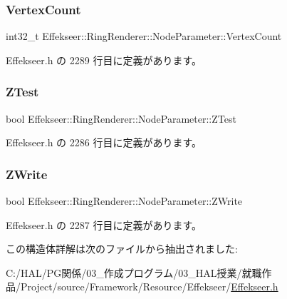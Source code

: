 \subsubsection{\texorpdfstring{Vertex\+Count}{VertexCount}}
{\footnotesize\ttfamily int32\+\_\+t Effekseer\+::\+Ring\+Renderer\+::\+Node\+Parameter\+::\+Vertex\+Count}



 Effekseer.\+h の 2289 行目に定義があります。

\mbox{\label{struct_effekseer_1_1_ring_renderer_1_1_node_parameter_a961db93480860064f1f432a6166e583e}} 
\subsubsection{\texorpdfstring{Z\+Test}{ZTest}}
{\footnotesize\ttfamily bool Effekseer\+::\+Ring\+Renderer\+::\+Node\+Parameter\+::\+Z\+Test}



 Effekseer.\+h の 2286 行目に定義があります。

\mbox{\label{struct_effekseer_1_1_ring_renderer_1_1_node_parameter_a26d4576d9bb81f221230f178637f352b}} 
\subsubsection{\texorpdfstring{Z\+Write}{ZWrite}}
{\footnotesize\ttfamily bool Effekseer\+::\+Ring\+Renderer\+::\+Node\+Parameter\+::\+Z\+Write}



 Effekseer.\+h の 2287 行目に定義があります。



この構造体詳解は次のファイルから抽出されました\+:\begin{DoxyCompactItemize}
\item 
C\+:/\+H\+A\+L/\+P\+G関係/03\+\_\+作成プログラム/03\+\_\+\+H\+A\+L授業/就職作品/\+Project/source/\+Framework/\+Resource/\+Effekseer/\mbox{\hyperlink{_effekseer_8h}{Effekseer.\+h}}\end{DoxyCompactItemize}
